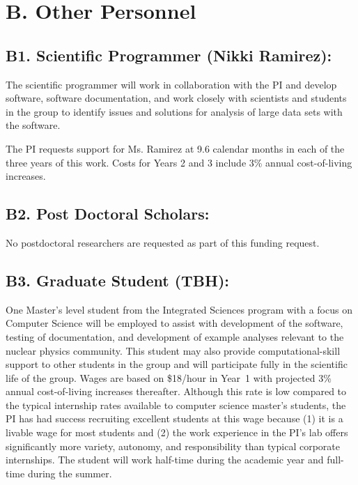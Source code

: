 \documentclass[11pt,oneside]{memoir}
\begin{document}
\section*{B. Other Personnel}

\subsection*{B1. Scientific Programmer (Nikki Ramirez):}

The scientific programmer will work in collaboration with the PI and develop software, software documentation, and work closely with scientists and students in the group to identify issues and solutions for analysis of large data sets with the software.

The PI requests support for Ms. Ramirez at 9.6 calendar months in each of the three years of this work. Costs for Years 2 and 3 include 3\% annual  cost-of-living increases. 

\subsection{B2.  Post Doctoral Scholars:}

No postdoctoral researchers are requested as part of this funding request.


\subsection{B3. Graduate Student (TBH):} 

One Master's level student from the Integrated Sciences program with a focus on Computer Science will be employed to assist with development of the software, testing of documentation, and development of example analyses relevant to the nuclear physics community.  This student may also provide computational-skill support to other students in the group and will participate fully in the scientific life of the group.  Wages are based on \$18/hour in Year~1 with projected 3\% annual cost-of-living increases thereafter. Although this rate is low compared to the typical internship rates available to computer science master's students, the PI has had success recruiting excellent students at this wage because (1) it is a livable wage for most students and (2) the work experience in the PI's lab offers significantly more variety, autonomy, and responsibility than typical corporate internships.  The student will work half-time during the academic year and full-time during the summer. 
\end{document}
